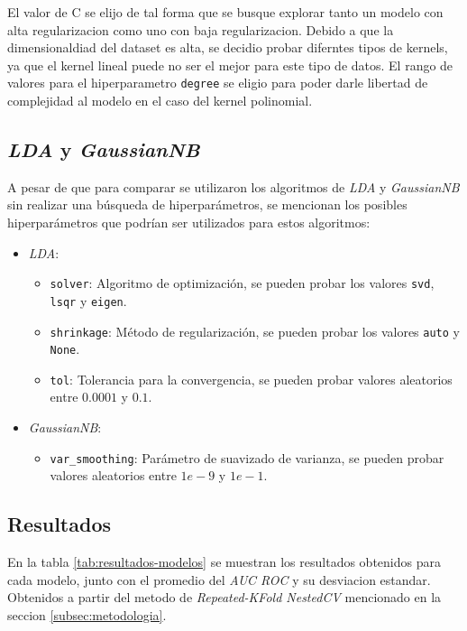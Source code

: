 \documentclass[10pt,a4paper]{article}
\begin{document}
El valor de C se elijo de tal forma que se busque explorar tanto un modelo con alta regularizacion como uno con baja regularizacion. Debido a que la dimensionaldiad del dataset es alta, 
se decidio probar diferntes tipos de kernels, ya que el kernel lineal puede no ser el mejor para este tipo de datos.
El rango de valores para el hiperparametro \texttt{degree} se eligio para poder darle libertad de complejidad al modelo en el caso del kernel polinomial.

\subsection{\textit{LDA} y \textit{GaussianNB}}

A pesar de que para comparar se utilizaron los algoritmos de \textit{LDA} y \textit{GaussianNB} sin realizar una búsqueda de hiperparámetros, se mencionan los posibles hiperparámetros
que podrían ser utilizados para estos algoritmos:
\begin{itemize}
    \item \textsl{LDA}:
    \begin{itemize}
        \item \texttt{solver}: Algoritmo de optimización, se pueden probar los valores \texttt{svd}, \texttt{lsqr} y \texttt{eigen}.
        \item \texttt{shrinkage}: Método de regularización, se pueden probar los valores \texttt{auto} y \texttt{None}.
        \item \texttt{tol}: Tolerancia para la convergencia, se pueden probar valores aleatorios entre $0.0001$ y $0.1$.
    \end{itemize}
    \item \textsl{GaussianNB}:
    \begin{itemize}
        \item \texttt{var\_smoothing}: Parámetro de suavizado de varianza, se pueden probar valores aleatorios entre $1e-9$ y $1e-1$.
    \end{itemize}
\end{itemize}

\subsection{Resultados}
En la tabla \ref{tab:resultados-modelos} se muestran los resultados obtenidos para cada modelo, junto con el promedio del \textit{AUC ROC} y su desviacion estandar. Obtenidos a partir del metodo
 de \textit{Repeated-KFold NestedCV} mencionado en la seccion \ref{subsec:metodologia}.
\end{document}
